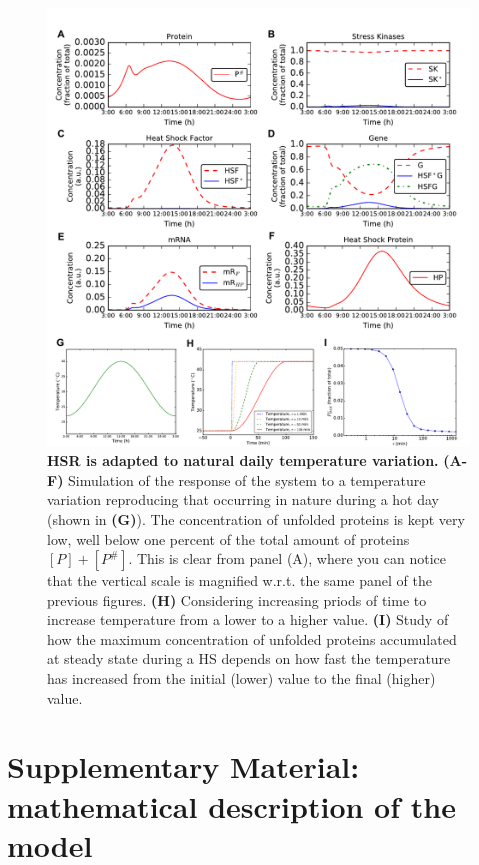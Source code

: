 \documentclass[oneside, 10pt, a4paper, twocolumn]{article}
\begin{document}
\begin{figure}
\centering
\includegraphics[width=\textwidth]{Figure4_Paper.pdf}
\caption{\small{\textbf{HSR is adapted to natural daily temperature variation.} \textbf{(A-F)} Simulation of the response of the system to a temperature variation reproducing that occurring in nature during a hot day (shown in \textbf{(G)}). The concentration of unfolded proteins is kept very low, well below one percent of the total amount of proteins $\left[P\right]+\left[P^\#\right]$. This is clear from panel (A), where you can notice that the vertical scale is magnified w.r.t. the same panel of the previous figures. \textbf{(H)} Considering increasing priods of time to increase temperature from a lower to a higher value. \textbf{(I)} Study of how the maximum concentration of unfolded proteins accumulated at steady state during a HS depends on how fast the temperature has increased from the initial (lower) value to the final (higher) value.}
}
\label{Figure4label}
\end{figure}

\clearpage


\appendix

\section{Supplementary Material: mathematical description of the model}
\label{Tables}
\end{document}
